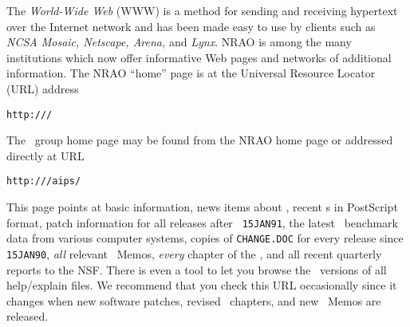      The {\it World-Wide Web\/} (WWW) is a method for sending and
receiving hypertext over the Internet network and has been made easy
to use by clients such as {\it NCSA Mosaic, Netscape, Arena,\/} and
{\it Lynx\/}.  NRAO is among the many institutions which now offer
informative Web pages and networks of additional information.  The
NRAO ``home'' page is at the Universal Resource Locator (URL) address
\begin{center} \vskip -10pt {\tt http://\www/} \vskip -10pt
\end{center} The \AIPS\ group home page may be found from the NRAO
home page or addressed directly at URL \begin{center} \vskip -10pt
{\tt http://\cww/aips/} \vskip -10pt \end{center} This page points at
basic information, news items about \AIPS, recent \AIPSLETTER s in
PostScript format, patch information for all releases after {\tt
15JAN91}, the latest \AIPS\ benchmark data from various computer
systems, copies of {\tt CHANGE.DOC} for every release since {\tt
15JAN90}, {\it all} relevant \AIPS\ Memos, {\it every} chapter of the
\Cookbook, and all recent quarterly reports to the \hbox{NSF}.  There
is even a tool to let you browse the \RELEASENAME\ versions of all
help/explain files.  We recommend that you check this URL occasionally
since it changes when new software patches, revised \Cookbook\
chapters, and new \AIPS\ Memos are released.

